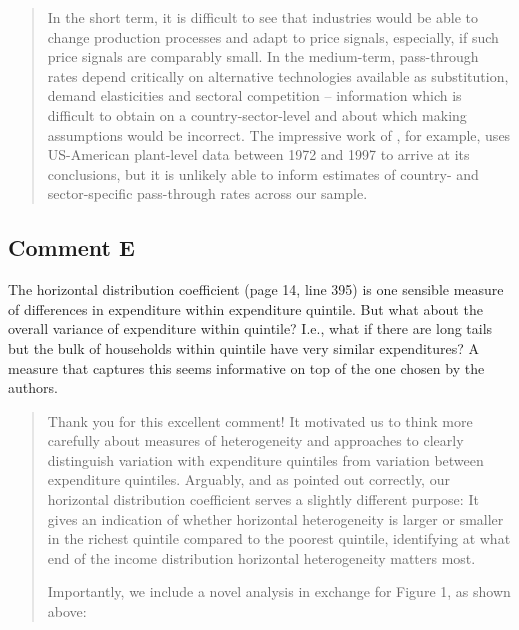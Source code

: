 \documentclass[11pt]{article}
\newenvironment{response}
{\begin{quote}\color{black}}
{\end{quote}}
\begin{document}
\begin{response}
    In the short term, it is difficult to see that industries would be able to change production processes and adapt to price signals, especially, if such price signals are comparably small. In the medium-term, pass-through rates depend critically on alternative technologies available as substitution, demand elasticities and sectoral competition -- information which is difficult to obtain on a country-sector-level and about which making assumptions would be incorrect. The impressive work of \textcite{Ganapati.2020}, for example, uses US-American plant-level data between 1972 and 1997 to arrive at its conclusions, but it is unlikely able to inform estimates of country- and sector-specific pass-through rates across our sample. 
\end{response}

\subsection*{Comment E}\label{comment_R1_E}

\begin{commentbox}
    The horizontal distribution coefficient (page 14, line 395) is one sensible measure of differences in expenditure within expenditure quintile. But what about the overall variance of expenditure within quintile? I.e., what if there are long tails but the bulk of households within quintile have very similar expenditures? A measure that captures this seems informative on top of the one chosen by the authors.
\end{commentbox}

\begin{response}

Thank you for this excellent comment! It motivated us to think more carefully about measures of heterogeneity and approaches to clearly distinguish variation with expenditure quintiles from variation between expenditure quintiles. Arguably, and as pointed out correctly, our horizontal distribution coefficient serves a slightly different purpose: It gives an indication of whether horizontal heterogeneity is larger or smaller in the richest quintile compared to the poorest quintile, identifying at what end of the income distribution horizontal heterogeneity matters most.

Importantly, we include a novel analysis in exchange for Figure 1, as shown above:

\end{response}
\end{document}
